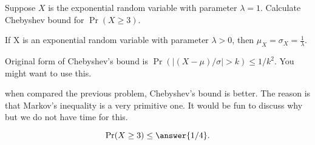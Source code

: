 \documentclass{ximera}
\begin{document}
\begin{problem}
Suppose $X$ is the exponential random variable with parameter $\lambda=1$. Calculate Chebyshev bound for $\Pr(X\geq 3)$. 
\begin{hint}
\item If X is an exponential random variable with parameter $\lambda>0$, then $\mu_X=\sigma_X=\frac{1}{\lambda}$.
\item Original form of Chebyshev's bound is $\Pr(|(X-\mu)/\sigma|>k)\leq 1/k^2$. You might want to use this. 
\item when compared the previous problem, Chebyshev's bound is better. The reason is that Markov's inequality is a very primitive one. It would be fun to discuss why but we do not have time for this. 
\end{hint}
\begin{prompt}%
$$\Pr(X\geq 3)\leq \answer{1/4}.$$

\end{prompt}
\end{problem}
\end{document}
